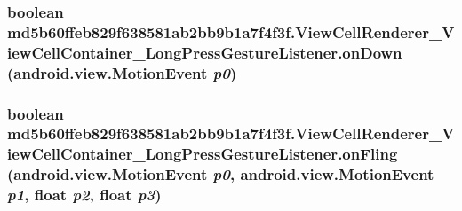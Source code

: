 \hypertarget{classmd5b60ffeb829f638581ab2bb9b1a7f4f3f_1_1_view_cell_renderer___view_cell_container___long_press_gesture_listener_c5058d423fa75bc3f59b7917a9c72270}{
\subsubsection[{onDown}]{\setlength{\rightskip}{0pt plus 5cm}boolean md5b60ffeb829f638581ab2bb9b1a7f4f3f.ViewCellRenderer\_\-ViewCellContainer\_\-LongPressGestureListener.onDown (android.view.MotionEvent {\em p0})}}
\label{classmd5b60ffeb829f638581ab2bb9b1a7f4f3f_1_1_view_cell_renderer___view_cell_container___long_press_gesture_listener_c5058d423fa75bc3f59b7917a9c72270}


\hypertarget{classmd5b60ffeb829f638581ab2bb9b1a7f4f3f_1_1_view_cell_renderer___view_cell_container___long_press_gesture_listener_512c1b77a4466f1d9d4b72ff43c67478}{
\subsubsection[{onFling}]{\setlength{\rightskip}{0pt plus 5cm}boolean md5b60ffeb829f638581ab2bb9b1a7f4f3f.ViewCellRenderer\_\-ViewCellContainer\_\-LongPressGestureListener.onFling (android.view.MotionEvent {\em p0}, \/  android.view.MotionEvent {\em p1}, \/  float {\em p2}, \/  float {\em p3})}}
\label{classmd5b60ffeb829f638581ab2bb9b1a7f4f3f_1_1_view_cell_renderer___view_cell_container___long_press_gesture_listener_512c1b77a4466f1d9d4b72ff43c67478}


